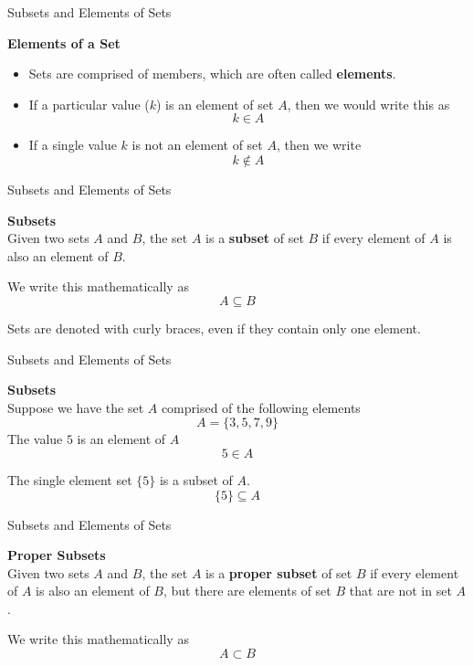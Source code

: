 {Subsets and Elements of Sets}

\textbf{Elements of a Set}\\
\begin{itemize}
\item Sets are comprised of members, which are often called \textbf{elements}. 
\item If a particular value ($k$) is an element of set $A$, then we would write this as
\[k \in A \]

\item If a single value $k$ is not an element of set $A$, then we write
\[k \notin A \]
\end{itemize}


{Subsets and Elements of Sets}

\textbf{Subsets}\\
Given two sets $A$ and $B$, the set $A$ is a \textbf{subset} of set $B$ if every element of $A$ is also an element of $B$. 


We write this mathematically as
\[A \subseteq B \]


\bigskip
Sets are denoted with curly braces, even if they contain only one element.



{Subsets and Elements of Sets}

\textbf{Subsets}\\
Suppose we have the set $A$ comprised of the following elements
\[ A =\{3,5,7,9\}\]
The value $5$ is an element of $A$
\[  5 \in A \]

The single element set $\{5\} $ is a subset of $A$.
\[ \{5\} \subseteq A\]



{Subsets and Elements of Sets}

\textbf{Proper Subsets}\\
Given two sets $A$ and $B$, the set $A$ is a \textbf{proper subset} of set $B$ if every element of $A$ is also an element of $B$, but there are elements of set $B$ that are not in set $A$.


We write this mathematically as
\[A \subset B \]



